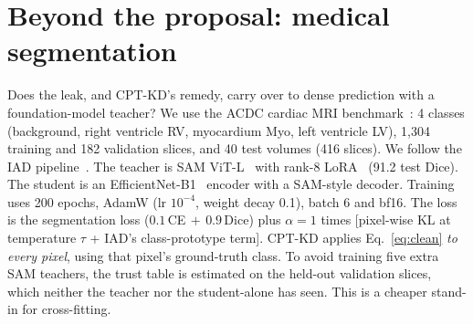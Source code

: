 \documentclass[10pt,twocolumn,letterpaper]{article}
\begin{document}
\section{Beyond the proposal: medical segmentation}
\label{sec:seg}
Does the leak, and CPT-KD's remedy, carry over to dense prediction with a foundation-model teacher? We use the ACDC cardiac MRI benchmark~\cite{bernard2018acdc}: 4 classes (background, right ventricle RV, myocardium Myo, left ventricle LV), 1{,}304 training and 182 validation slices, and 40 test volumes (416 slices). We follow the IAD pipeline~\cite{hong2026iad}. The teacher is SAM ViT-L~\cite{kirillov2023sam} with rank-8 LoRA~\cite{hu2022lora} (91.2 test Dice). The student is an EfficientNet-B1~\cite{tan2019efficientnet} encoder with a SAM-style decoder. Training uses 200 epochs, AdamW (lr $10^{-4}$, weight decay 0.1), batch 6 and bf16. The loss is the segmentation loss ($0.1\,$CE$\,+\,0.9\,$Dice) plus $\alpha{=}1$ times [pixel-wise KL at temperature $\tau$ + IAD's class-prototype term]. CPT-KD applies Eq.~\eqref{eq:clean} \emph{to every pixel}, using that pixel's ground-truth class. To avoid training five extra SAM teachers, the trust table is estimated on the held-out validation slices, which neither the teacher nor the student-alone has seen. This is a cheaper stand-in for cross-fitting.
\end{document}
